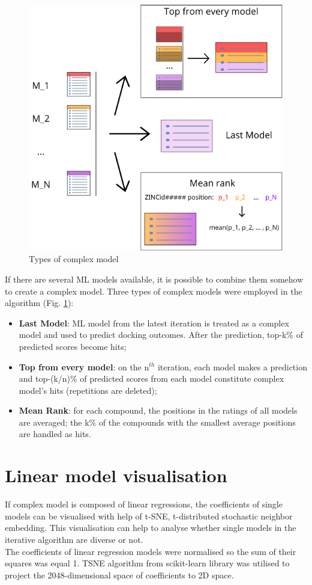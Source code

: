 \begin{figure}
    \centering
    \includegraphics[scale=0.8]{Images/image2.png}
    \caption{Types of complex model}
    \label{ComplexModels}
\end{figure}

If there are several ML models available, it is possible to combine them somehow to create a complex model.
Three types of complex models were employed in the algorithm (Fig. \ref{ComplexModels}):
\begin{itemize}
    \item \textbf{Last Model}: ML model from the latest iteration is treated as a complex model and used to predict docking outcomes.
    After the prediction, top-k\% of predicted scores become hits;
    \item \textbf{Top from every model}: on the $\text{n}^{th}$ iteration, each model makes a prediction and top-(k/n)\% of predicted scores from each model constitute complex model's hits (repetitions are deleted);
    \item \textbf{Mean Rank}: for each compound, the positions in the ratings of all models are averaged; the k\% of the compounds with the smallest average positions are handled as hits.
\end{itemize}


\section{Linear model visualisation}
If complex model is composed of linear regressions, the coefficients of single models can be visualised with help of t-SNE, t-distributed stochastic neighbor embedding.
This visualisation can help to analyse whether single models in the iterative algorithm are diverse or not. \\

The coefficients of linear regression models were normalised so the sum of their squares was equal 1.
TSNE algorithm from scikit-learn library was utilised to project the 2048-dimensional space of coefficients to 2D space. 

